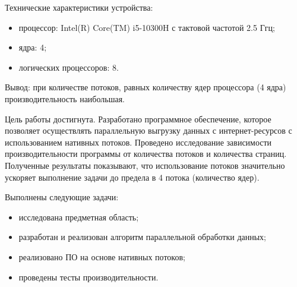 Технические характеристики устройства:
\begin{itemize}
    \item процессор: Intel(R) Core(TM) i5-10300H с тактовой частотой 2.5 Ггц;
	\item ядра: 4;
	\item логических процессоров: 8.
\end{itemize}


Вывод: при количестве потоков, равных количеству ядер процессора (4 ядра) производительность наибольшая.





\clearpage
{}

Цель работы достигнута. Разработано программное обеспечение, которое позволяет осуществлять параллельную выгрузку данных с интернет-ресурсов с использованием нативных потоков. Проведено исследование зависимости производительности программы от количества потоков и количества страниц. Полученные результаты показывают, что использование потоков значительно ускоряет выполнение задачи до предела в 4 потока (количество ядер).

Выполнены следующие задачи: 
\begin{itemize} 
	\item исследована предметная область; 
	\item разработан и реализован алгоритм параллельной обработки данных; 
	\item реализовано ПО на основе нативных потоков; 
	\item проведены тесты производительности. 
\end{itemize}